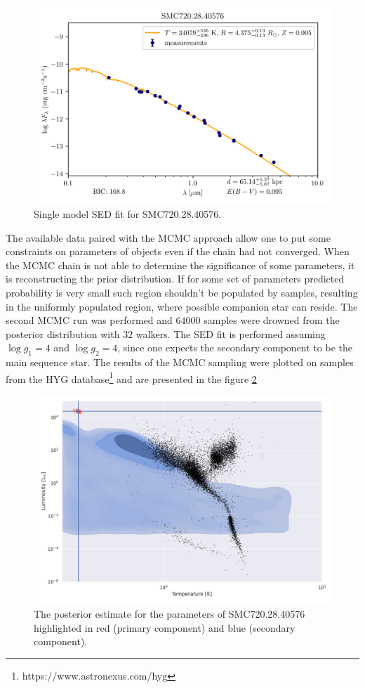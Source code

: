 \documentclass{pracalicmgr}
\begin{document}
\begin{figure}[H]
    \centering
    \includegraphics[scale=1]{plots/SMC720.28.40576_simple_emcee.png}
    \caption{Single model SED fit for SMC720.28.40576.}
    \label{SMC720:sed}
\end{figure}
The available data paired with the MCMC approach allow one to put some constraints on parameters of objects even if the chain had not converged. 
When the MCMC chain is not able to determine the significance of some parameters, it is reconstructing the prior distribution.
If for some set of parameters predicted probability is very small
such region shouldn't be populated by samples, resulting in the uniformly populated region, where possible companion star can reside.
The second MCMC run was performed and $64000$ samples were drowned from the posterior distribution with $32$ walkers. 
The SED fit is performed assuming $\log g_1=4$ and $\log g_2=4$, since one expects the secondary component to be the
main sequence star. 
The results of the MCMC sampling were plotted on samples from the HYG
database\footnote{https://www.astronexus.com/hyg} and are presented in the figure \ref{posterior}
\begin{figure}[H]
    \includegraphics[scale=0.6]{plots/posterior_estimate_SMC720.png}
    \caption{The posterior estimate for the parameters of SMC720.28.40576 highlighted in red (primary component)
    and blue (secondary component).}\label{posterior}
\end{figure}
\end{document}
